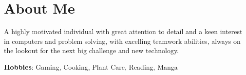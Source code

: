\documentclass[letterpaper,11pt]{article}
\begin{document}
\section{About Me}

{A highly motivated individual with great attention to detail and a keen interest in computers and problem solving, with excelling teamwork abilities, always on the lookout for the next big challenge and new technology.}

 \begin{itemize}[leftmargin=0.15in, label={}]
    \small{\item{
     \textbf{Hobbies}{: Gaming, Cooking, Plant Care, Reading, Manga} \\
    }}
 \end{itemize}
 
%
\end{document}
